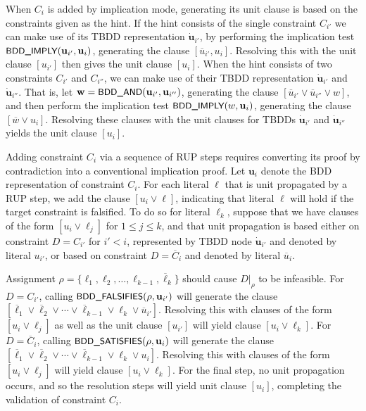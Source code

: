 \documentclass{easychair}
\renewcommand{\obar}[1]{\overline{#1}}
\newcommand{\lit}{\ell}
\newcommand{\trust}[1]{\dot {#1}}
\newcommand{\assign}{\rho}
\newcommand{\simplify}[2]{#1|_{#2}}
\newcommand{\fname}[1]{\mbox{\small\sf #1}}
\newcommand{\node}[1]{\mathbf{#1}}
\newcommand{\nodeu}{\node{u}}
\newcommand{\nodew}{\node{w}}
\begin{document}
When $C_i$ is added by implication mode, generating its unit clause is
based on the constraints given as the hint.
If the hint consists of the
single constraint $C_{i'}$ we can make use of its TBDD representation
$\trust{\nodeu}_{i'}$, by performing the implication test
$\fname{BDD\_IMPLY}(\nodeu_{i'}, \nodeu_i)$, generating the clause
$[\obar{u}_{i'}, u_i]$.  Resolving this with the unit clause
$[u_{i'}]$ then gives the unit clause $[u_i]$.  When the hint consists
of two constraints $C_{i'}$ and $C_{i''}$, we can make use of their
TBDD representation $\trust{\nodeu}_{i'}$ and $\trust{\nodeu}_{i''}$.
That is, let $\nodew = \fname{BDD\_AND}(\nodeu_{i'}, \nodeu_{i''})$,
generating the clause
$[\obar{u}_{i'} \lor \obar{u}_{i''}  \lor w]$, and then
perform the implication test $\fname{BDD\_IMPLY}(w, \nodeu_i)$, generating the clause $[\obar{w} \lor u_i]$.
Resolving these clauses with the unit clauses for TBDDs
$\trust{\nodeu}_{i'}$ and $\trust{\nodeu}_{i''}$
yields the unit clause $[u_i]$.

Adding constraint $C_i$ via a sequence of RUP steps requires
converting its proof by contradiction into a conventional implication
proof.
Let $\nodeu_i$ denote the BDD representation of constraint
$C_i$.  For each literal $\lit$ that is unit propagated by a RUP step,
we add the clause $[u_i \lor \lit]$, indicating that literal $\lit$
will hold if the target constraint is falsified.  To do so for literal
$\lit_k$, suppose that we have clauses of the form $[u_i \lor
  \lit_{j}]$ for $1 \leq j \leq k$, and that unit propagation is based
either on constraint $D = C_{i'}$ for $i' < i$, represented by TBDD node
$\trust{\nodeu}_{i'}$ and denoted by literal $u_{i'}$, or based on
constraint $D = \obar{C}_{i}$ and denoted by literal $\obar{u}_i$.

Assignment $\assign = \{ \lit_1, \lit_2, \ldots, \lit_{k-1}, \obar{\lit}_{k} \}$
should cause $\simplify{D}{\assign}$ to be infeasible.
For $D = C_{i'}$, calling
$\fname{BDD\_FALSIFIES}(\assign, \nodeu_{i'})$ will generate the clause
$[\obar{\lit}_1 \lor \obar{\lit}_2 \lor \cdots \lor \obar{\lit}_{k-1} \lor \lit_k \lor \obar{u}_{i'}]$.
Resolving this with clauses of the form $[u_i \lor \lit_{j}]$ as well as the unit clause $[u_{i'}]$
will yield clause $[u_i \lor \lit_{k}]$.
For $D = \obar{C}_{i}$, calling
$\fname{BDD\_SATISFIES}(\assign, \nodeu_i)$ will generate the clause
$[\obar{\lit}_1 \lor \obar{\lit}_2 \lor \cdots \lor \obar{\lit}_{k-1} \lor \lit_k \lor u_i]$.
Resolving this with clauses of the form $[u_i \lor \lit_{j}]$
will yield clause $[u_i \lor \lit_{k}]$.
For the final step, no unit propagation occurs, and so the resolution steps will yield unit clause $[u_i]$,
completing the validation of constraint $C_i$.


\end{document}

